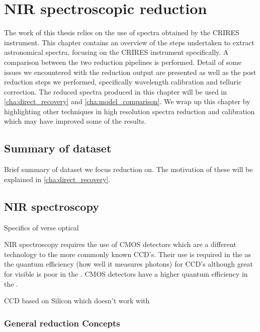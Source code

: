 
\chapter{NIR spectroscopic reduction} %
\label{cha:reduction}
The work of this thesis relies on the use of \nir{} spectra obtained by the CRIRES instrument. This chapter contains an overview of the steps undertaken to extract astronomical spectra, focusing on the CRIRES instrument specifically. A comparison between the two reduction pipelines is performed. Detail of some issues we encountered with the reduction output are presented as well as the post reduction steps we performed, specifically wavelength calibration and telluric correction. The reduced spectra produced in this chapter will be used in \cref{cha:direct_recovery} and \cref{cha:model_comparison}. We wrap up this chapter by highlighting other techniques in high resolution \nir{} spectra reduction and calibration which may have improved some of the results.

\section{Summary of dataset}
\todo{}{}
Brief summary of dataset we focus reduction on. The motivation of these will be explained in \cref{cha:direct_recovery}.


\section{NIR spectroscopy}
\todo{}{}
Specifics of \nir{} verse optical

NIR spectroscopy requires the use of CMOS detectors which are a different technology to the more commonly known CCD's. Their use is required in the \nir{} as the quantum efficiency (how well it measures photons) for CCD's although great for visible is poor in the \nir. CMOS detectors have a higher quantum efficiency in the \nir.

CCD based on Silicon which doesn't work with \nir


\subsection{General reduction Concepts}
\label{subsec:nirreduction}

